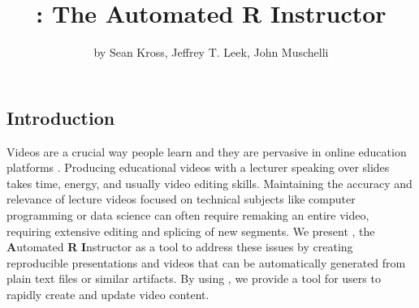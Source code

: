 \title{: The Automated R Instructor}
\author{by Sean Kross, Jeffrey T. Leek, John Muschelli}

\maketitle


\hypertarget{introduction}{%
\subsection{Introduction}\label{introduction}}

Videos are a crucial way people learn and they are pervasive in online
education platforms \citep{hsin2013short, hartsell2006video}. Producing
educational videos with a lecturer speaking over slides takes time,
energy, and usually video editing skills. Maintaining the accuracy and
relevance of lecture videos focused on technical subjects like computer
programming or data science can often require remaking an entire video,
requiring extensive editing and splicing of new segments. We present
, the \textbf{A}utomated \textbf{R} \textbf{I}nstructor as
a tool to address these issues by creating reproducible presentations
and videos that can be automatically generated from plain text files or
similar artifacts. By using , we provide a tool for users to
rapidly create and update video content.

